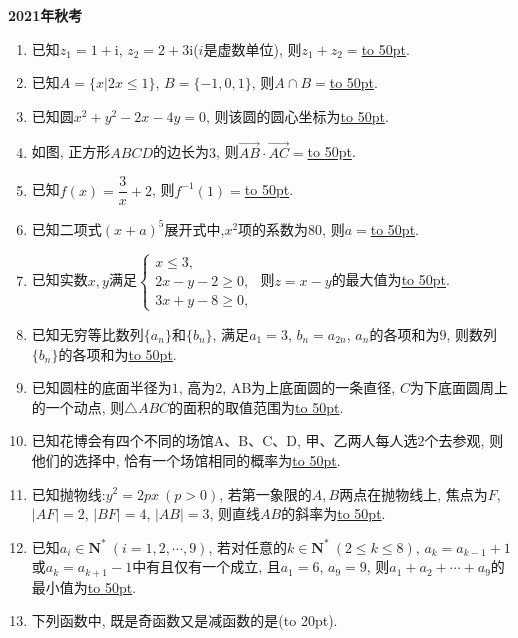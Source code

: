 \documentclass[10pt,a4paper]{article}
\newcommand{\blank}[1]{\underline{\hbox to #1pt{}}}
\newcommand{\bracket}[1]{(\hbox to #1pt{})}
\begin{document}
{\bf 2021年秋考}

\begin{enumerate}[1.]
\item 已知$z_1=1+\mathrm{i}$, $z_2=2+3\mathrm{i}$($i$是虚数单位), 则$z_1+z_2=$\blank{50}.
\item 已知$A=\{x|2x\le 1\}$, $B=\{-1,0,1\}$, 则$A\cap B=$\blank{50}.
\item 已知圆$x^2+y^2-2x-4y=0$, 则该圆的圆心坐标为\blank{50}.
\item 如图, 正方形$ABCD$的边长为$3$, 则$\overrightarrow{AB}\cdot \overrightarrow{AC}=$\blank{50}.
\begin{center}
\end{center}
\item 已知$f(x)=\dfrac3x+2$, 则$f^{-1}(1)=$\blank{50}.
\item 已知二项式$(x+a)^5$展开式中,$x^2$项的系数为$80$, 则$a=$\blank{50}.
\item 已知实数$x,y$满足$\begin{cases} x\le 3,  \\ 2x-y-2 \ge 0,  \\ 3x+y-8 \ge 0,  \end{cases}$ 则$z=x-y$的最大值为\blank{50}.
\item 已知无穷等比数列$\{a_n\}$和$\{b_n\}$, 满足$a_1=3$, $b_n=a_{2n}$, $a_n$的各项和为$9$, 则数列$\{b_n\}$的各项和为\blank{50}.
\item 已知圆柱的底面半径为$1$, 高为$2$, AB为上底面圆的一条直径, $C$为下底面圆周上的一个动点, 则$\triangle ABC$的面积的取值范围为\blank{50}.
\item 已知花博会有四个不同的场馆A、B、C、D, 甲、乙两人每人选$2$个去参观, 则他们的选择中, 恰有一个场馆相同的概率为\blank{50}.
\item 已知抛物线:$y^2=2px \ (p>0)$, 若第一象限的$A,B$两点在抛物线上, 焦点为$F$, $|AF|=2$, $|BF|=4$, $|AB|=3$, 则直线$AB$的斜率为\blank{50}.
\item 已知$a_i\in \mathbf{N}^* \ (i=1,2,\cdots,9)$, 若对任意的$k\in \mathbf{N}^* \ (2\le k\le 8)$, $a_k=a_{k-1}+1$或$a_k=a_{k+1}-1$中有且仅有一个成立, 且$a_1=6$, $a_9=9$, 则$a_1+a_2+\cdots+a_9$的最小值为\blank{50}.
\item 下列函数中, 既是奇函数又是减函数的是\bracket{20}.

\end{enumerate}
\end{document}
